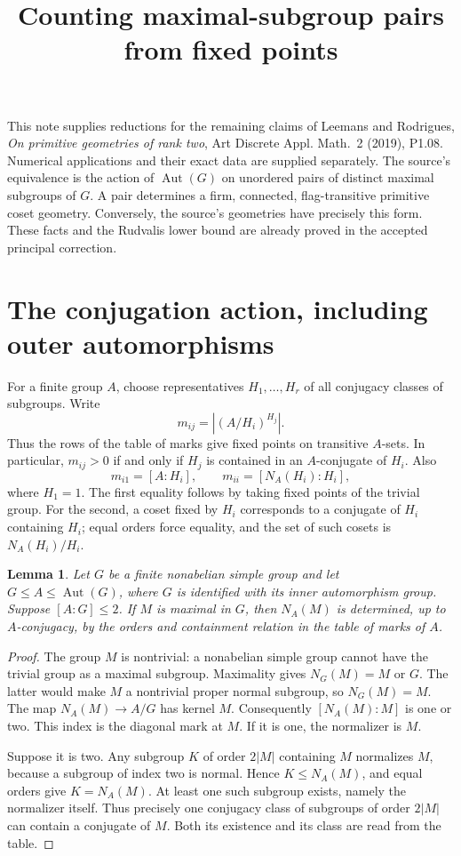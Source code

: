 \documentclass[11pt]{article}
\title{Counting maximal-subgroup pairs from fixed points}
\author{}
\date{}
\newtheorem{lemma}[theorem]{Lemma}
\newcommand{\Aut}{\operatorname{Aut}}
\begin{document}
\maketitle
This note supplies reductions for the remaining claims of Leemans and
Rodrigues, \emph{On primitive geometries of rank two}, Art Discrete Appl.
Math.\ 2 (2019), P1.08. Numerical applications and their exact data are supplied separately.
The source's equivalence is the action of $\Aut(G)$ on unordered pairs of
distinct maximal subgroups of $G$. A pair determines a firm, connected,
flag-transitive primitive coset geometry. Conversely, the source's
geometries have precisely this form. These facts and the Rudvalis lower
bound are already proved in the accepted principal correction.

\section{The conjugation action, including outer automorphisms}
For a finite group $A$, choose representatives $H_1,\ldots,H_r$ of all
conjugacy classes of subgroups. Write
\[
 m_{ij}=|(A/H_i)^{H_j}|.
\]
Thus the rows of the table of marks give fixed points on transitive
$A$-sets. In particular, $m_{ij}>0$ if and only if $H_j$ is contained
in an $A$-conjugate of $H_i$. Also
\[
 m_{i1}=[A:H_i],\qquad m_{ii}=[N_A(H_i):H_i],
\]
where $H_1=1$. The first equality follows by taking fixed points of the
trivial group. For the second, a coset fixed by $H_i$ corresponds to a
conjugate of $H_i$ containing $H_i$; equal orders force equality, and
the set of such cosets is $N_A(H_i)/H_i$.

\begin{lemma}\label{normalizer}
Let $G$ be a finite nonabelian simple group and let
$G\leq A\leq\Aut(G)$, where $G$ is identified with its inner
 automorphism group. Suppose $[A:G]\leq2$. If $M$ is maximal in $G$,
then $N_A(M)$ is determined, up to $A$-conjugacy, by the orders and
containment relation in the table of marks of $A$.
\end{lemma}
\begin{proof}
The group $M$ is nontrivial: a nonabelian simple group cannot have the
trivial group as a maximal subgroup. Maximality gives $N_G(M)=M$ or
$G$. The latter would make $M$ a nontrivial proper normal subgroup,
so $N_G(M)=M$. The map $N_A(M)\to A/G$ has kernel $M$. Consequently
$[N_A(M):M]$ is one or two. This index is the diagonal mark at $M$.
If it is one, the normalizer is $M$.

Suppose it is two. Any subgroup $K$ of order $2|M|$ containing $M$
normalizes $M$, because a subgroup of index two is normal. Hence
$K\leq N_A(M)$, and equal orders give $K=N_A(M)$. At least one such
subgroup exists, namely the normalizer itself. Thus precisely one
conjugacy class of subgroups of order $2|M|$ can contain a conjugate
of $M$. Both its existence and its class are read from the table.
\end{proof}
\end{document}
